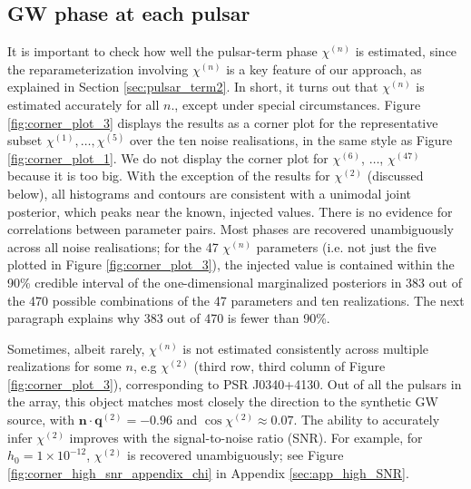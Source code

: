 \documentclass[fleqn,usenatbib,useAMS]{mnras}
\begin{document}
\subsection{GW phase at each pulsar} \label{sec:chi_estim}
It is important to check how well the pulsar-term phase $\chi^{(n)}$ is estimated, since the reparameterization involving $\chi^{(n)}$ is a key feature of our approach, as explained in Section \ref{sec:pulsar_term2}. In short, it turns out that $\chi^{(n)}$ is estimated accurately for all $n$., except under special circumstances. Figure \ref{fig:corner_plot_3} displays the results as a corner plot for the representative subset $\chi^{(1)}, \dots, \chi^{(5)}$ over the ten noise realisations, in the same style as Figure \ref{fig:corner_plot_1}. We do not display the corner plot for $\chi^{(6)}$, $\dots$, $\chi^{(47)}$ because it is too big. With the exception of the results for $\chi^{(2)}$ (discussed below), all histograms and contours are consistent with a unimodal joint posterior, which peaks near the known, injected values. There is no evidence for correlations between parameter pairs. Most phases are recovered unambiguously across all noise realisations; for the 47 $\chi^{(n)}$ parameters (i.e. not just the five plotted in Figure \ref{fig:corner_plot_3}), the injected value is  contained within the 90\% credible interval of the one-dimensional marginalized posteriors in 383 out of the 470 possible combinations of the 47 parameters and ten realizations. The next paragraph explains why 383 out of 470 is fewer than 90\%. \newline 

Sometimes, albeit rarely, $\chi^{(n)}$ is not estimated consistently across multiple realizations for some $n$, e.g $\chi^{(2)}$ (third row, third column of Figure \ref{fig:corner_plot_3}), corresponding to PSR J0340+4130. Out of all the pulsars in the array, this object matches most closely the direction to the synthetic GW source, with $\boldsymbol{n} \cdot \boldsymbol{q}^{(2)} = -0.96$ and $\cos \chi^{(2)} \approx 0.07$. The ability to accurately infer $\chi^{(2)}$ improves with the signal-to-noise ratio (SNR). For example, for $h_0 = 1 \times 10^{-12}$, $\chi^{(2)}$ is recovered unambiguously; see Figure \ref{fig:corner_high_snr_appendix_chi} in Appendix \ref{sec:app_high_SNR}. \newline 
\end{document}
